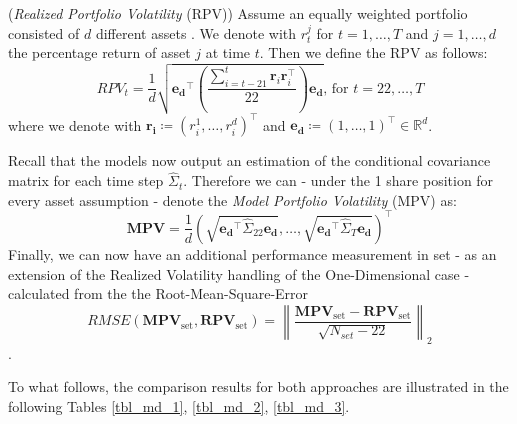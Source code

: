 \documentclass[a4paper, oneside]{discothesis}
\begin{document}
\begin{definition}(\textit{Realized Portfolio Volatility} (RPV))
Assume an equally weighted  portfolio consisted of $d$ different assets . We denote with $r^j_t$ for $t = 1, \dots, T$ and $j = 1,\dots, d$ the percentage return of asset $j$ at time $t$. Then we define the RPV as follows:
\begin{equation}
    RPV_t = \frac{1}{d}\sqrt{\mathbf{e_d}^\intercal \left(\frac{\sum_{i=t-21}^t \mathbf{r}_{i}\mathbf{r}_{i}^\intercal}{22}\right)\mathbf{e_d}} \text{, for } t = 22,\dots, T
\end{equation}
where we denote with $\mathbf{r_i}\coloneqq(r_i^1, \dots, r_i^d)^\intercal$ and $\mathbf{e_d} \coloneqq (1, \dots, 1)^\intercal \in \mathbb{R}^d$.
\end{definition}

Recall that the models now output an estimation of the conditional covariance matrix for each time step $\widehat{\Sigma}_t$. Therefore we can - under the 1 share position for every asset assumption - denote the \textit{Model Portfolio Volatility} (MPV) as: 
\begin{equation}
    \mathbf{MPV} = \frac{1}{d} \left(\sqrt{\mathbf{e_d}^\intercal \widehat{\Sigma}_{22} \mathbf{e_d}}, \dots, \sqrt{\mathbf{e_d}^\intercal \widehat{\Sigma}_T \mathbf{e_d}}\right)^\intercal
\end{equation}  
Finally, we can now have an additional performance measurement in set - as an extension of the Realized Volatility handling of the One-Dimensional case - calculated from the the Root-Mean-Square-Error
\begin{equation}
    RMSE\left(\mathbf{MPV}_{\text{set}}, \mathbf{RPV}_\text{set}\right) =  \left\|\frac{\mathbf{MPV}_{\text{set}}-\mathbf{RPV}_\text{set}}{\sqrt{N_{set}-22}}\right\|_2 
\end{equation}.

To what follows, the comparison results for both approaches are illustrated in the following Tables \ref{tbl_md_1}, \ref{tbl_md_2}, \ref{tbl_md_3}.
\end{document}
